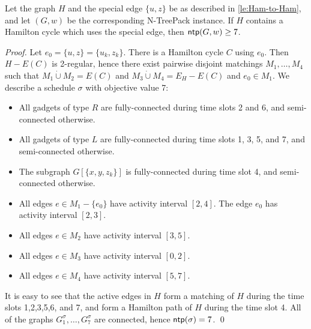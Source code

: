 \documentclass[runningheads]{llncs}
\newcommand{\set}[1]{\{ #1 \}}
\newcommand{\dotunion}{\mathbin{\dot{\cup}}}
\newcommand{\xxxNTP}{{\sc N-TreePack}}
\DeclareMathOperator{\ntp}{\text{\sf ntp}}
\begin{document}
\begin{lemma}
\label{lemma:lasse-if}
Let the graph $H$ and the special edge $\set{u,z}$ be as described in \cref{le:Ham-to-Ham}, and let $(G, w)$ be the corresponding {\xxxNTP} instance. 
If $H$ contains a Hamilton cycle which uses the special edge, then $\ntp(G, w) \geq 7$.
\end{lemma}
\begin{proof}
Let $e_0 = \set{u, z} = \set{u_k, z_k}$. There is a Hamilton cycle $C$ using $e_0$. Then $H-E(C)$ is 2-regular, hence there exist pairwise disjoint matchings $M_1, \ldots, M_4$ such that $M_1 \dotunion M_2 = E(C)$ and $M_3 \dotunion M_4 = E_H-E(C)$ and $e_0 \in M_1$. We describe a schedule $\sigma$ with objective value 7:
\begin{itemize}
\item All gadgets of type $R$ are fully-connected during time slots 2 and 6, and semi-connected otherwise.
\item All gadgets of type $L$ are fully-connected during time slots 1, 3, 5, and 7, and semi-connected otherwise.
\item The subgraph $G[\set{x, y, z_k}]$ is fully-connected during time slot 4, and semi-connected otherwise.
\item All edges $e \in M_1 - \set{e_0}$ have activity interval $[2, 4]$. The edge $e_0$ has activity interval $[2, 3]$.
\item All edges $e \in M_2$ have activity interval $[3, 5]$.
\item All edges $e \in M_3$ have activity interval $[0, 2]$.
\item All edges $e \in M_4$ have activity interval $[5, 7]$.
\end{itemize}
It is easy to see that the active edges in $H$ form a matching of $H$ during the time slots 1,2,3,5,6, and 7, 
and form a Hamilton path of $H$ during the time slot 4. 
All of the graphs $G^\sigma_1,\ldots,G^\sigma_7$ are connected, hence $\ntp(\sigma) = 7$. 
\qed
\end{proof}
\end{document}
